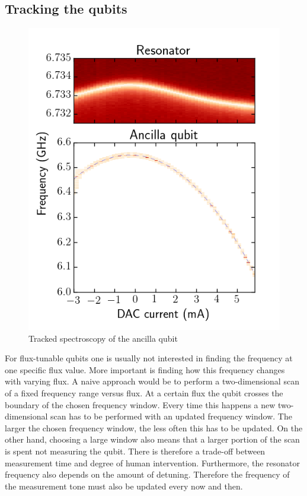       \subsection{Tracking the qubits}
        \label{ssec:tracked spectroscopy}

        \begin{figure}
          \begin{center}
          \vspace{-30pt}
            \includegraphics[width=\textwidth]{../Figures/Qubit characterization/Tracked_spectroscopy.png}
          \end{center}
          \vspace{-20 pt}
          \caption{Tracked spectroscopy of the ancilla qubit}
          \label{fig:tracked spectroscopy}
        \end{figure}

        For flux-tunable qubits one is usually not interested in finding the frequency at one specific flux value. More important is finding how this frequency changes with varying flux. A naive approach would be to perform a two-dimensional scan of a fixed frequency range versus flux. At a certain flux the qubit crosses the boundary of the chosen frequency window. Every time this happens a new two-dimensional scan has to be performed with an updated frequency window. The larger the chosen frequency window, the less often this has to be updated. On the other hand, choosing a large window also means that a larger portion of the scan is spent not measuring the qubit. There is therefore a trade-off between measurement time and degree of human intervention. Furthermore, the resonator frequency also depends on the amount of detuning. Therefore the frequency of the measurement tone must also be updated every now and then.

